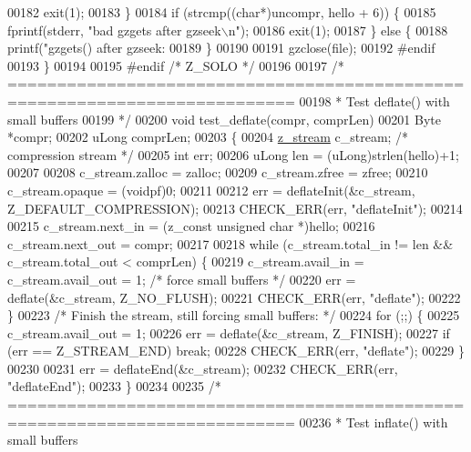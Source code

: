 \begin{DoxyCode}
{{{{{{{{{{00182         exit(1);
00183     \}
00184     \textcolor{keywordflow}{if} (strcmp((\textcolor{keywordtype}{char}*)uncompr, hello + 6)) \{
00185         fprintf(stderr, \textcolor{stringliteral}{"bad gzgets after gzseek\(\backslash\)n"});
00186         exit(1);
00187     \} \textcolor{keywordflow}{else} \{
00188         printf(\textcolor{stringliteral}{"gzgets() after gzseek: %
00189     \}
00190 
00191     gzclose(file);
00192 \textcolor{preprocessor}{#endif}
00193 \}
00194 
00195 \textcolor{preprocessor}{#endif }\textcolor{comment}{/* Z\_SOLO */}\textcolor{preprocessor}{}
00196 
00197 \textcolor{comment}{/* ===========================================================================}
00198 \textcolor{comment}{ * Test deflate() with small buffers}
00199 \textcolor{comment}{ */}
00200 \textcolor{keywordtype}{void} test\_deflate(compr, comprLen)
00201     Byte *compr;
00202     uLong comprLen;
00203 \{
00204     \hyperlink{structz__stream__s}{z\_stream} c\_stream; \textcolor{comment}{/* compression stream */}
00205     \textcolor{keywordtype}{int} err;
00206     uLong len = (uLong)strlen(hello)+1;
00207 
00208     c\_stream.zalloc = zalloc;
00209     c\_stream.zfree = zfree;
00210     c\_stream.opaque = (voidpf)0;
00211 
00212     err = deflateInit(&c\_stream, Z\_DEFAULT\_COMPRESSION);
00213     CHECK\_ERR(err, \textcolor{stringliteral}{"deflateInit"});
00214 
00215     c\_stream.next\_in  = (z\_const \textcolor{keywordtype}{unsigned} \textcolor{keywordtype}{char} *)hello;
00216     c\_stream.next\_out = compr;
00217 
00218     \textcolor{keywordflow}{while} (c\_stream.total\_in != len && c\_stream.total\_out < comprLen) \{
00219         c\_stream.avail\_in = c\_stream.avail\_out = 1; \textcolor{comment}{/* force small buffers */}
00220         err = deflate(&c\_stream, Z\_NO\_FLUSH);
00221         CHECK\_ERR(err, \textcolor{stringliteral}{"deflate"});
00222     \}
00223     \textcolor{comment}{/* Finish the stream, still forcing small buffers: */}
00224     \textcolor{keywordflow}{for} (;;) \{
00225         c\_stream.avail\_out = 1;
00226         err = deflate(&c\_stream, Z\_FINISH);
00227         \textcolor{keywordflow}{if} (err == Z\_STREAM\_END) \textcolor{keywordflow}{break};
00228         CHECK\_ERR(err, \textcolor{stringliteral}{"deflate"});
00229     \}
00230 
00231     err = deflateEnd(&c\_stream);
00232     CHECK\_ERR(err, \textcolor{stringliteral}{"deflateEnd"});
00233 \}
00234 
00235 \textcolor{comment}{/* ===========================================================================}
00236 \textcolor{comment}{ * Test inflate() with small buffers}
}}}}}}}}}}}
\end{DoxyCode}
